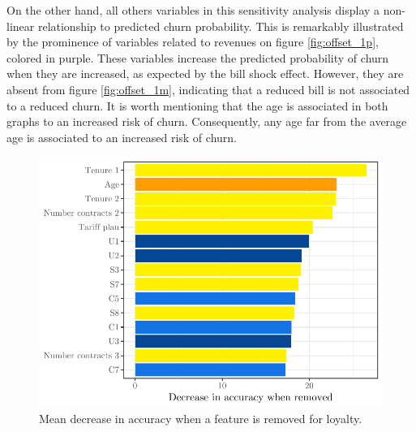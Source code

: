 On the other hand, all others variables in this sensitivity analysis display a
non-linear relationship to predicted churn probability. This is remarkably
illustrated by the prominence of variables related to revenues on figure
\ref{fig:offset_1p}, colored in purple. These variables increase the predicted
probability of churn when they are increased, as expected by the bill shock
effect. However, they are absent from figure \ref{fig:offset_1m}, indicating
that a reduced bill is not associated to a reduced churn. It is worth mentioning
that the age is associated in both graphs to an increased risk of churn.
Consequently, any age far from the average age is associated to an increased
risk of churn.


\begin{figure}
    \centering
    \includegraphics[width=0.9\linewidth]{figures/var_imp_loy_decrease_accuracy.pdf}
    \caption{Mean decrease in accuracy when a feature is removed for loyalty.}
    \label{fig:var_imp_loy_decrease_accuracy}
\end{figure}

